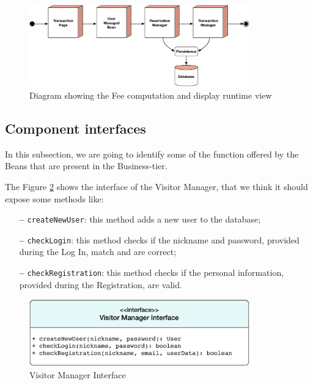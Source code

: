 \begin{figure}[htbp]
\centering
\vspace{104pt}
\includegraphics[width=0.85\textwidth]{Images/FeeRun.pdf}
\vspace{10pt}
\caption{Diagram showing the Fee computation and display runtime view}
\label{fig:fee}
\end{figure}
\clearpage

\subsection{Component interfaces} \label{comp-inter}
In this subsection, we are going to identify some of the function offered by the Beans that are present in the Business-tier.

\newline
The Figure \ref{fig:visitor} shows the interface of the Visitor Manager, that we think it should expose some methods like:

\begin{itemize}
\item[\textbf{--}] \texttt{createNewUser}: this method adds a new user to the database;
\item[\textbf{--}] \texttt{checkLogin}: this method checks if the nickname and password, provided during the Log In, match and are correct;
\item[\textbf{--}] \texttt{checkRegistration}: this method checks if the personal information, provided during the Registration, are valid.
\end{itemize}

\begin{figure}[htbp]
\centering
\vspace{52pt}
\includegraphics[width=0.85\textwidth]{Images/VisitorManager.pdf}
\vspace{10pt}
\caption{Visitor Manager Interface}
\label{fig:visitor}
\end{figure}
\clearpage

